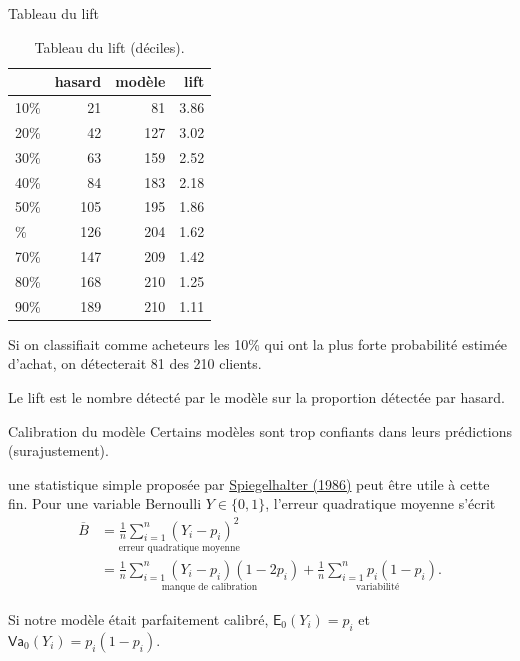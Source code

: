\documentclass[
  ignorenonframetext,
]{beamer}
\begin{document}
\begin{frame}{Tableau du lift}
\protect\hypertarget{tableau-du-lift}{}
\hypertarget{tbl-lift}{}
\begin{table}
\caption{\label{tbl-lift}Tableau du lift (déciles). }\tabularnewline

\centering
\begin{tabular}{lrrr}
\toprule
  & hasard & modèle & lift\\
\midrule
10\% & 21 & 81 & 3.86\\
20\% & 42 & 127 & 3.02\\
30\% & 63 & 159 & 2.52\\
40\% & 84 & 183 & 2.18\\
50\% & 105 & 195 & 1.86\\
\addlinespace
60\% & 126 & 204 & 1.62\\
70\% & 147 & 209 & 1.42\\
80\% & 168 & 210 & 1.25\\
90\% & 189 & 210 & 1.11\\
\bottomrule
\end{tabular}
\end{table}

\footnotesize

Si on classifiait comme acheteurs les 10\% qui ont la plus forte
probabilité estimée d'achat, on détecterait 81 des 210 clients.

Le lift est le nombre détecté par le modèle sur la proportion détectée
par hasard. \normalsize
\end{frame}

\begin{frame}{Calibration du modèle}
\protect\hypertarget{calibration-du-moduxe8le}{}
Certains modèles sont trop confiants dans leurs prédictions
(surajustement).

une statistique simple proposée par
\href{https://doi.org/10.1002/sim.4780050506}{Spiegelhalter (1986)} peut
être utile à cette fin. Pour une variable Bernoulli \(Y \in \{0,1\}\),
l'erreur quadratique moyenne s'écrit \begin{align*}
\overline{B} &= \underset{\text{erreur quadratique moyenne}}{\frac{1}{n} \sum_{i=1}^n (Y_i-p_i)^2}
\\&=\underset{\text{manque de calibration}}{\frac{1}{n} \sum_{i=1}^n(Y_i-p_i)(1-2p_i)} + \underset{\text{variabilité}}{\frac{1}{n} \sum_{i=1}^n p_i(1-p_i)}.
\end{align*}

Si notre modèle était parfaitement calibré, \(\mathsf{E}_0(Y_i)=p_i\) et
\(\mathsf{Va}_0(Y_i) = p_i(1-p_i)\).
\end{frame}
\end{document}
